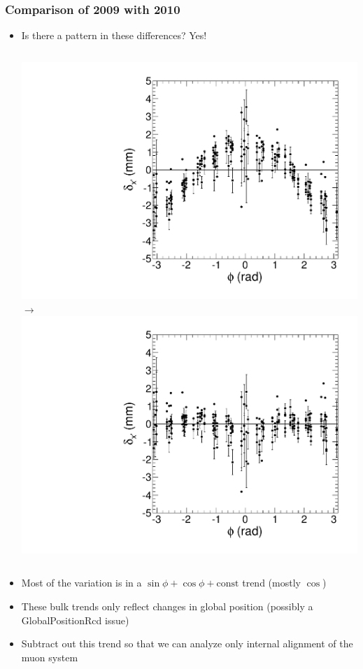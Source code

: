 \documentclass[compress]{beamer}
\begin{document}
\begin{frame}
\frametitle{Comparison of 2009 with 2010}

\begin{itemize}
\item Is there a pattern in these differences?  Yes!

\begin{columns}
\includegraphics[width=\linewidth]{craft09_craft10_x_phi.pdf}
\hfill {\bf $\longrightarrow$} \hfill
{}
\includegraphics[width=\linewidth]{craft09_craft10_x_phi_real.pdf}
\end{columns}

\item Most of the variation is in a $\sin\phi + \cos\phi + \mbox{const}$ trend (mostly $\cos$)

\item These bulk trends only reflect changes in global position (possibly a GlobalPositionRcd issue)

\item Subtract out this trend so that we can analyze only internal alignment of the muon system
\end{itemize}
\end{frame}
\end{document}
